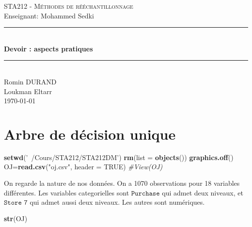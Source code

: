 \documentclass[
]{article}
\author{}
\date{\vspace{-2.5em}}
\newenvironment{Shaded}{\begin{snugshade}}{\end{snugshade}}
\newcommand{\CommentTok}[1]{\textcolor[rgb]{0.56,0.35,0.01}{\textit{#1}}}
\newcommand{\DataTypeTok}[1]{\textcolor[rgb]{0.13,0.29,0.53}{#1}}
\newcommand{\KeywordTok}[1]{\textcolor[rgb]{0.13,0.29,0.53}{\textbf{#1}}}
\newcommand{\NormalTok}[1]{#1}
\newcommand{\OtherTok}[1]{\textcolor[rgb]{0.56,0.35,0.01}{#1}}
\newcommand{\StringTok}[1]{\textcolor[rgb]{0.31,0.60,0.02}{#1}}
\begin{document}
\begin{titlepage}
\newcommand{\HRule}{\rule{\linewidth}{0.5mm}}
\center
\textsc{\LARGE
STA212 - Méthodes de rééchantillonnage} \\[2cm]
\LARGE Enseignant: Mohammed Sedki  \\[2cm]

\HRule \\[0.4cm]
{ \huge \bfseries Devoir : aspects pratiques \\[0.15cm] }
\HRule \\[3cm] \LARGE
Romin DURAND \\
Loukman Eltarr
\\[3cm]
\today \\ [1cm]
\end{titlepage}

\hypertarget{arbre-de-duxe9cision-unique}{%
\section{Arbre de décision unique}\label{arbre-de-duxe9cision-unique}}

\begin{Shaded}
\begin{Highlighting}[]
\KeywordTok{setwd}\NormalTok{(}\StringTok{'~/Cours/STA212/STA212DM'}\NormalTok{)}
\KeywordTok{rm}\NormalTok{(}\DataTypeTok{list =} \KeywordTok{objects}\NormalTok{())}
\KeywordTok{graphics.off}\NormalTok{()}
\NormalTok{OJ=}\KeywordTok{read.csv}\NormalTok{(}\StringTok{"oj.csv"}\NormalTok{, }\DataTypeTok{header =} \OtherTok{TRUE}\NormalTok{)}
\CommentTok{#View(OJ)}
\end{Highlighting}
\end{Shaded}

On regarde la nature de nos données. On a 1070 observations pour 18
variables différentes. Les variables categorielles sont
\(\texttt{Purchase}\) qui admet deux niveaux, et \(\texttt{Store 7}\)
qui admet aussi deux niveaux. Les autres sont numériques.

\begin{Shaded}
\begin{Highlighting}[]
\KeywordTok{str}\NormalTok{(OJ) }
\end{Highlighting}
\end{Shaded}
\end{document}
